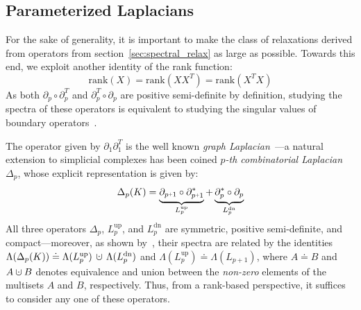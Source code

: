 \documentclass[10pt]{article}
\numberwithin{equation}{section}
\newcommand{\+}{%
	\raisebox{0.18ex}{\scaleobj{0.55}{+}}
}
\theoremstyle{definition}
\theoremstyle{definition}
\newcommand{\cupdot}{\mathbin{\mathaccent\cdot\cup}}
\begin{document}
\subsection{Parameterized Laplacians}\label{sec:laplacian_theory2}
For the sake of generality, it is important to make the class of relaxations derived from operators from section~\ref{sec:spectral_relax} as large as possible.
Towards this end, we exploit another identity of the rank function:
$$\mathrm{rank}(X) = \mathrm{rank}(X X^T) = \mathrm{rank}(X^T X)$$ 
As both $\partial_p \circ \partial_p^T$ and $\partial_p^T \circ \partial_p$ are positive semi-definite by definition, studying the spectra of these operators is equivalent to studying the singular values of boundary operators~\cite{horak2013spectra}.  

The operator given by $\partial_1 \partial_1^T$ is the well known \emph{graph Laplacian}~\cite{chung1997spectral}---a natural extension to simplicial complexes has been coined \emph{$p$-th combinatorial Laplacian} $\Delta_p$, whose explicit representation is given by: 
\begin{equation}\label{eq:comb_lap}
	\Delta_p(K) = 
	\underbrace{\partial_{p\+1} \circ \partial_{p\+1}^\ast}_{L_p^{\text{up}}} + \underbrace{\partial_{p}^\ast  \circ  \partial_{p}}_{L_p^{\text{dn}}} 
\end{equation}
\noindent 
All three operators $\Delta_p$, $L_p^{\text{up}}$, and $L_p^{\text{dn}}$ are symmetric, positive semi-definite, and compact---moreover, as shown by~\cite{horak2013spectra}, their spectra are related by the identities $\Lambda(\Delta_p(K)) \doteq \Lambda(L_p^{\text{up}}) \, \cupdot \, \Lambda(L_p^{\text{dn}})$ and $\Lambda(L_p^{\text{up}}) \doteq \Lambda(L_{p+1})$,
where $A \doteq B$ and $A \cupdot B$ denotes equivalence and union between the \emph{non-zero} elements of the multisets $A$ and $B$, respectively.
Thus, from a rank-based perspective, it suffices to consider any one of these operators.
\end{document}

